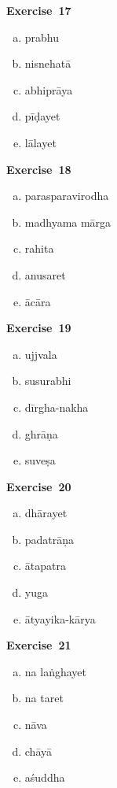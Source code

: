 \begin{multicols}{2}
\noindent\textbf{Exercise~17}
\vspace{-10pt}
\begin{enumerate}[a.]
\itemsep=0pt
\item prabhu
\item nisnehatā
\item abhiprāya
\item pīḍayet
\item lālayet
\end{enumerate}
\eject

\noindent\textbf{Exercise~18}
\vspace{-10pt}
\begin{enumerate}[a.]
\itemsep=0pt
\item parasparavirodha
\item madhyama mārga 
\item rahita
\item anusaret 
\item ācāra
\end{enumerate}
\vspace{-5pt}

\noindent\textbf{Exercise~19}
\vspace{-10pt}
\begin{enumerate}[a.]
\itemsep=0pt
\item ujjvala
\item susurabhi
\item dīrgha-nakha
\item ghrāṇa
\item suveṣa
\end{enumerate}
\vspace{-5pt}

\noindent\textbf{Exercise~20}
\vspace{-10pt}
\begin{enumerate}[a.]
\itemsep=0pt
\item dhārayet 
\item padatrāṇa 
\item ātapatra 
\item yuga
\item ātyayika-kārya
\end{enumerate}
\vspace{-5pt}

\noindent\textbf{Exercise~21}
\vspace{-10pt}
\begin{enumerate}[a.]
\itemsep=0pt
\item na laṅghayet 
\item na taret
\item nāva 
\item chāyā 
\item aśuddha
\end{enumerate}
\vspace{-5pt}


\end{multicols}
